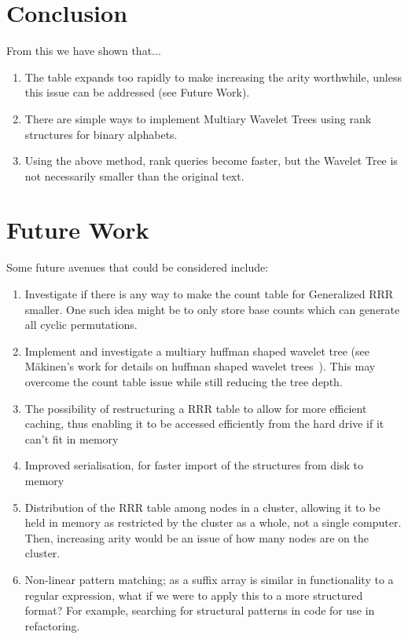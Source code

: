 \section{Conclusion}
\label{sec:conclusion}

From this we have shown that...
\begin{enumerate}
\item
 	The table expands too rapidly to make increasing the arity worthwhile,
	unless this issue can be addressed (see Future Work).
\item
	There are simple ways to implement Multiary Wavelet Trees using rank
	structures for binary alphabets.
\item
	Using the above method, rank queries become faster, but the Wavelet Tree is 
	not necessarily smaller than the original text.
\end{enumerate}

\section{Future Work}
\label{sec:future}
Some future avenues that could be considered include:

\begin{enumerate}
\item
	Investigate if there is any way to make the count table for Generalized RRR 
	smaller. One such idea might be to only store base counts which can
	generate all cyclic permutations.
	
\item
	Implement and investigate a multiary huffman shaped wavelet tree (see 
	M\"{a}kinen's work for details on huffman shaped wavelet
	trees~\cite{huffmanWT:makinen2005}). This may
	overcome the count table issue while still reducing the tree depth.

\item
	The possibility of restructuring a RRR table to allow for more
    efficient caching, thus enabling it to be accessed efficiently from the
	hard drive if it can't fit in memory

\item
	Improved serialisation, for faster import of the structures from disk to
	memory

\item
	Distribution of the RRR table among nodes in a cluster, allowing it to be
	held in memory as restricted by the cluster as a whole, not a single
	computer. Then, increasing arity would be an issue of how many nodes are
	on the cluster.

\item
	Non-linear pattern matching; as a suffix array is similar in functionality
	to a regular expression, what if we were to apply this to a more 
	structured format? For example, searching for structural patterns in code
	for use in refactoring.
\end{enumerate}